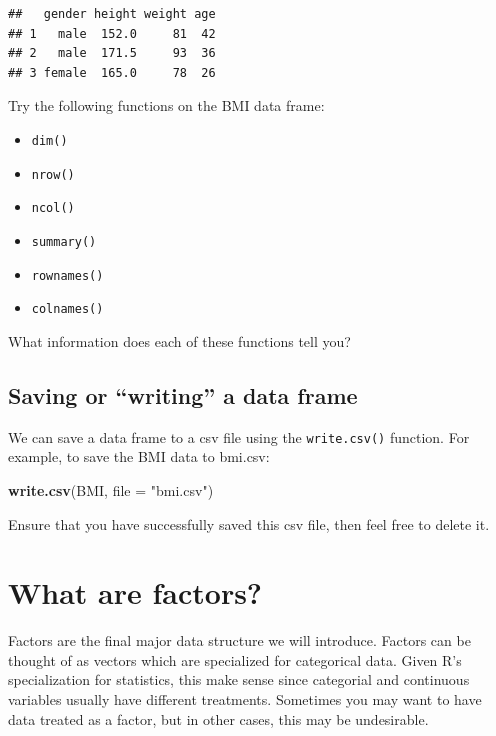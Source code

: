 \documentclass[]{book}
\newenvironment{Shaded}{\begin{snugshade}}{\end{snugshade}}
\newcommand{\DataTypeTok}[1]{\textcolor[rgb]{0.13,0.29,0.53}{#1}}
\newcommand{\KeywordTok}[1]{\textcolor[rgb]{0.13,0.29,0.53}{\textbf{#1}}}
\newcommand{\NormalTok}[1]{#1}
\newcommand{\StringTok}[1]{\textcolor[rgb]{0.31,0.60,0.02}{#1}}
\providecommand{\tightlist}{%
  \setlength{\itemsep}{0pt}\setlength{\parskip}{0pt}}
\begin{document}
\begin{verbatim}
##   gender height weight age
## 1   male  152.0     81  42
## 2   male  171.5     93  36
## 3 female  165.0     78  26
\end{verbatim}

Try the following functions on the BMI data frame:

\begin{itemize}
\tightlist
\item
  \texttt{dim()}
\item
  \texttt{nrow()}
\item
  \texttt{ncol()}
\item
  \texttt{summary()}
\item
  \texttt{rownames()}
\item
  \texttt{colnames()}
\end{itemize}

What information does each of these functions tell you?

\hypertarget{saving-or-writing-a-data-frame}{%
\subsection*{Saving or ``writing'' a data frame}\label{saving-or-writing-a-data-frame}}

We can save a data frame to a csv file using the \texttt{write.csv()} function. For example, to save the BMI data to bmi.csv:

\begin{Shaded}
\begin{Highlighting}[]
\KeywordTok{write.csv}\NormalTok{(BMI, }\DataTypeTok{file =} \StringTok{"bmi.csv"}\NormalTok{)}
\end{Highlighting}
\end{Shaded}

Ensure that you have successfully saved this csv file, then feel free to delete it.

\hypertarget{what-are-factors}{%
\section{What are factors?}\label{what-are-factors}}

Factors are the final major data structure we will introduce. Factors can be thought of as vectors which are specialized for categorical data. Given R's specialization for statistics, this make sense since categorial and continuous variables usually have different treatments. Sometimes you may want to have data treated as a factor, but in other cases, this may be undesirable.
\end{document}
